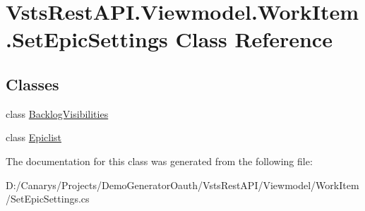 \hypertarget{class_vsts_rest_a_p_i_1_1_viewmodel_1_1_work_item_1_1_set_epic_settings}{}\section{Vsts\+Rest\+A\+P\+I.\+Viewmodel.\+Work\+Item.\+Set\+Epic\+Settings Class Reference}
\label{class_vsts_rest_a_p_i_1_1_viewmodel_1_1_work_item_1_1_set_epic_settings}
\subsection*{Classes}
\begin{DoxyCompactItemize}
\item 
class \mbox{\hyperlink{class_vsts_rest_a_p_i_1_1_viewmodel_1_1_work_item_1_1_set_epic_settings_1_1_backlog_visibilities}{Backlog\+Visibilities}}
\item 
class \mbox{\hyperlink{class_vsts_rest_a_p_i_1_1_viewmodel_1_1_work_item_1_1_set_epic_settings_1_1_epiclist}{Epiclist}}
\end{DoxyCompactItemize}


The documentation for this class was generated from the following file\+:\begin{DoxyCompactItemize}
\item 
D\+:/\+Canarys/\+Projects/\+Demo\+Generator\+Oauth/\+Vsts\+Rest\+A\+P\+I/\+Viewmodel/\+Work\+Item/Set\+Epic\+Settings.\+cs\end{DoxyCompactItemize}
